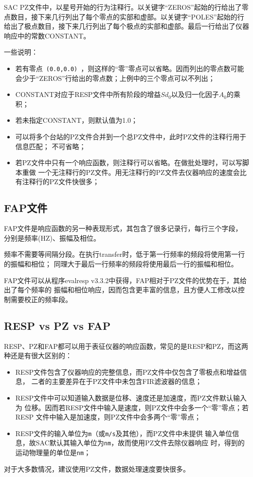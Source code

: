 SAC PZ文件中，以星号开始的行为注释行。以关键字``ZEROS''起始的行给出了零点数目，接下来几行列出了每个零点的实部和虚部。以关键字``POLES''起始的行给出了极点数目，接下来几行列出了每个极点的实部和虚部。最后一行给出了仪器响应中的常数CONSTANT。

一些说明：
\begin{itemize}
\item 若有零点~\verb+(0.0,0.0)+~，则这样的``零''零点可以省略。因而列出的零点数可能会少于``ZEROS''行给出的零点数；上例中的三个零点可以不列出；
\item CONSTANT对应于RESP文件中所有阶段的增益$Sd_0$以及归一化因子$A_0$的乘积；
\item 若未指定CONSTANT，则默认值为1.0；
\item 可以将多个台站的PZ文件合并到一个总PZ文件中，此时PZ文件的注释行用于信息匹配；
    不可省略；
\item 若PZ文件中只有一个响应函数，则注释行可以省略。在做批处理时，可以写脚本重做
    一个无注释行的PZ文件。用无注释行的PZ文件去仪器响应的速度会比有注释行的PZ文件快很多；
\end{itemize}

\subsection{FAP文件}
FAP文件是响应函数的另一种表现形式，其包含了很多记录行，每行三个字段，
分别是频率(HZ)、振幅及相位。

频率不需要等间隔分段。在执行transfer时，低于第一行频率的频段将使用第一行的振幅和相位；
同理大于最后一行频率的频段将使用最后一行的振幅和相位。

FAP文件可以从程序evalresp v3.3.2中获得，FAP相对于PZ文件的优势在于，其给出了每个频率的
振幅和相位响应，因而包含更丰富的信息，且方便人工修改以控制需要校正的频率段。

\subsection{RESP vs PZ vs FAP}
RESP、PZ和FAP都可以用于表征仪器的响应函数，常见的是RESP和PZ，而这两种还是有很大区别的：

\begin{itemize}
\item RESP文件包含了仪器响应的完整信息，而PZ文件中仅包含了零极点和增益信息，
    二者的主要差异在于PZ文件中未包含FIR滤波器的信息；
\item RESP文件中可以知道输入数据是位移、速度还是加速度，而PZ文件默认输入为
    位移。因而若RESP文件中输入是速度，则PZ文件中会多一个``零''零点；若RESP
    文件中输入是加速度，则PZ文件中会多两个``零''零点；
\item RESP文件的输入单位为\verb+m+（或\verb+m/s+及其他），而PZ文件中未提供
    输入单位信息，故SAC默认其输入单位为\verb+nm+，故而使用PZ文件去除仪器响应
    时，得到的运动物理量的单位是\verb+nm+；
\end{itemize}

对于大多数情况，建议使用PZ文件，数据处理速度要快很多。
